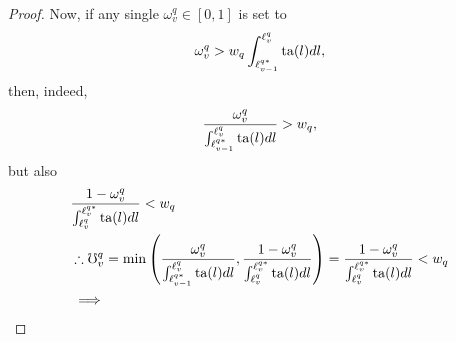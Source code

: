 \documentclass[hidelinks, nonatbib]{elsarticle}
\begin{document}
\begin{lemma}
\begin{proof}
        Now, if any single $\omega_{v}^{q} \in [0,1]$ is set to
        \begin{gather}
            \omega_{v}^{q} > 
            w_q
            \int_{
                \ell_{v-1}^{q*}
            }^{
                \ell_{v}^{q}
            }{
                \text{ta}(l)
                dl
            }
            ,
        \end{gather}
        then, indeed,
        \begin{gather}
            \frac{
                \omega_{v}^{q}
            }{
                \int_{
                    \ell_{v-1}^{q*}
                }^{
                    \ell_{v}^{q}
                }{
                    \text{ta}(l)dl
                }
            }
            >
            w_q
            ,
        \end{gather}
        but also
        \begin{align}
            &
            \frac{
                1 - \omega_{v}^{q}
            }{
                \int_{
                    \ell_{v}^{q}
                }^{
                    \ell_{v}^{q*}
                }{
                    \ta(l)dl
                }
            }
            <
            w_q
            \\
            &\therefore
            \oo_{v}^{q} = 
            \min\left(
                \frac{
                    \omega_{v}^{q}
                }{
                    \int_{
                        \ell_{v-1}^{q*}
                    }^{
                        \ell_{v}^{q}
                    }
                    \ta(l)dl
                }
                ,
                \frac{
                    1-\omega_{v}^{q}
                }{
                    \int_{
                        \ell_{v}^{q}
                    }^{
                        \ell_{v}^{q*}
                    }
                    \ta(l)dl
                }
            \right)
            =
            \frac{
                1 - \omega_{v}^{q}
            }{
                \int_{
                    \ell_{v}^{q}
                }^{
                    \ell_{v}^{q*}
                }{
                    \ta(l)dl
                }
            }
            <
            w_q
            \\
            &\implies

\end{align}
\end{proof}
\end{lemma}
\end{document}
